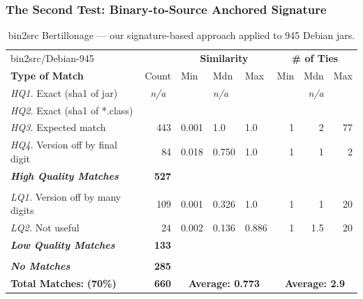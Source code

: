 \subsubsection{The Second Test: Binary-to-Source Anchored Signature}


\begin{table}[h]
  \centering
\begin{tabular}[htbp]{l|r|lll|rrr}
  bin2src/Debian-945                     &       & \multicolumn{3}{c|}{\textbf{Similarity}}  & \multicolumn{3}{c}{\textbf{\# of Ties}} \\
  \textbf{Type of Match}                 & Count & Min   & Mdn   & Max   & Min & Mdn  & Max  \\
  \hline
  \emph{HQ1.} Exact (sha1 of jar)        & \multicolumn{1}{c|}{\emph{n/a}} & & \emph{n/a} & & & \emph{n/a} &  \\
  \emph{HQ2.} Exact (sha1 of *.class)    & & & & & & & \\
  \emph{HQ3.} Expected match             & 443   & 0.001 & 1.0   & 1.0   & 1   & 2    & 77   \\
  \emph{HQ4.} Version off by final digit &  84   & 0.018 & 0.750 & 1.0   & 1   & 1    &  2   \\
  \emph{\textbf{High Quality Matches}}   & \textbf{527} &       &        &       &      &      &      \\
& & & & & & & \\
  \emph{LQ1.} Version off by many digits & 109   & 0.001 & 0.326 & 1.0   & 1   & 1    & 20   \\
  \emph{LQ2.} Not useful                 &  24   & 0.002 & 0.136 & 0.886 & 1   & 1.5  & 20   \\
  \emph{\textbf{Low Quality Matches}}    & \textbf{133} &       &        &       &      &      &      \\
& & & & & & & \\
  \emph{\textbf{No Matches}}             & \textbf{285} &       &        &       &      &      &     \\
  \hline
  \textbf{Total Matches:} \hspace{3em}    \textbf{(70\%)} &  \textbf{660}  & \multicolumn{3}{c|}{\textbf{Average: 0.773}}  & \multicolumn{3}{c}{\textbf{Average: 2.9}} \\
\end{tabular}
  \caption{bin2src Bertillonage --- our signature-based approach applied to
    945 Debian jars.}
  \label{tab:debianBin2Src}
\end{table}

